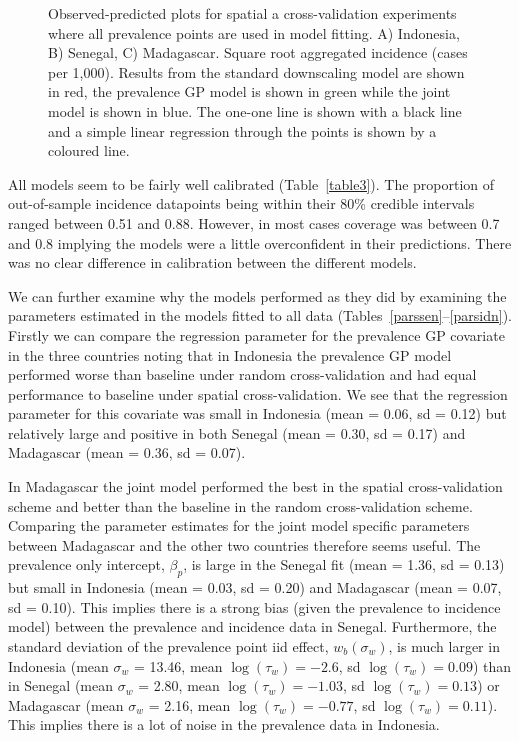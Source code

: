 \documentclass{statsoc}
\begin{document}


\begin{figure}
\caption{\label{spatial2predobspolyfacet} Observed-predicted plots for spatial a cross-validation experiments where all prevalence points are used in model fitting.
A) Indonesia, B) Senegal, C) Madagascar. Square root aggregated incidence (cases per 1,000).
Results from the standard downscaling model are shown in red, the prevalence GP model is shown in green while the joint model is shown in blue.
The one-one line is shown with a black line and a simple linear regression through the points is shown by a coloured line.
}

\end{figure}




All models seem to be fairly well calibrated (Table~\ref{table3}).
The proportion of out-of-sample incidence datapoints being within their 80\% credible intervals ranged between 0.51 and 0.88.
However, in most cases coverage was between 0.7 and 0.8 implying the models were a little overconfident in their predictions.
There was no clear difference in calibration between the different models.


We can further examine why the models performed as they did by examining the parameters estimated in the models fitted to all data (Tables~\ref{parssen}--\ref{parsidn}).
Firstly we can compare the regression parameter for the prevalence GP covariate in the three countries noting that in Indonesia the prevalence GP model performed worse than baseline under random cross-validation and had equal performance to baseline under spatial cross-validation.
We see that the regression parameter for this covariate was small in Indonesia (mean = 0.06, sd = 0.12) but relatively large and positive in both Senegal (mean = 0.30, sd = 0.17) and Madagascar  (mean = 0.36, sd = 0.07).


In Madagascar the joint model performed the best in the spatial cross-validation scheme and better than the baseline in the random cross-validation scheme. 
Comparing the parameter estimates for the joint model specific parameters between Madagascar and the other two countries therefore seems useful.
The prevalence only intercept, $\beta_p$, is large in the Senegal fit (mean = 1.36, sd = 0.13) but small in Indonesia (mean = 0.03, sd = 0.20) and Madagascar (mean = 0.07, sd = 0.10).
This implies there is a strong bias (given the prevalence to incidence model) between the prevalence and incidence data in Senegal.
Furthermore, the standard deviation of the prevalence point iid effect, $w_b(\sigma_w)$, is much larger in Indonesia (mean $\sigma_w$ = 13.46, mean $\log(\tau_w) = -2.6$, sd $\log(\tau_w) = 0.09$) than in Senegal (mean $\sigma_w$ = 2.80, mean $\log(\tau_w) = -1.03$, sd $\log(\tau_w) = 0.13$) or Madagascar (mean $\sigma_w$ = 2.16, mean $\log(\tau_w) = -0.77$, sd $\log(\tau_w) = 0.11$).
This implies there is a lot of noise in the prevalence data in Indonesia.
\end{document}
